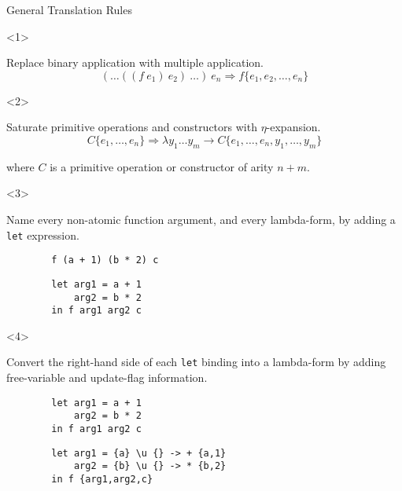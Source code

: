 \documentclass{beamer}
\begin{document}
\begin{frame}[fragile]{General Translation Rules}
  \begin{onlyenv}<1>
    \begin{block}{Replace binary application with multiple application.}
      $$(\ldots((f\ e_1)\  e_2)\  \ldots)\ e_n
      \Rightarrow
      f \{e_1,e_2,\ldots,e_n\}$$
    \end{block}
  \end{onlyenv}

  \begin{onlyenv}<2>
    \begin{block}{Saturate primitive operations and constructors with
        $\eta$-expansion.}
      $$C \{e_1,\ldots,e_n\}
      \Rightarrow
      \lambda y_1 \ldots y_m \rightarrow C \{e_1,\ldots,e_n,y_1,\ldots,y_m\}$$

      where $C$ is a primitive operation or constructor of arity $n + m$.
    \end{block}
  \end{onlyenv}

  \begin{onlyenv}<3>
    \begin{block}{Name every non-atomic function argument, and every
        lambda-form, by adding a \texttt{let} expression.}
      \begin{verbatim}
        f (a + 1) (b * 2) c
      \end{verbatim}
      \begin{verbatim}
        let arg1 = a + 1
            arg2 = b * 2
        in f arg1 arg2 c
      \end{verbatim}
    \end{block}
  \end{onlyenv}

  \begin{onlyenv}<4>
    \begin{block}{Convert the right-hand side of each \texttt{let} binding into
        a lambda-form by adding free-variable and update-flag information.}
      \begin{verbatim}
        let arg1 = a + 1
            arg2 = b * 2
        in f arg1 arg2 c
      \end{verbatim}
      \begin{verbatim}
        let arg1 = {a} \u {} -> + {a,1}
            arg2 = {b} \u {} -> * {b,2}
        in f {arg1,arg2,c}
      \end{verbatim}
    \end{block}
  \end{onlyenv}
\end{frame}
\end{document}
